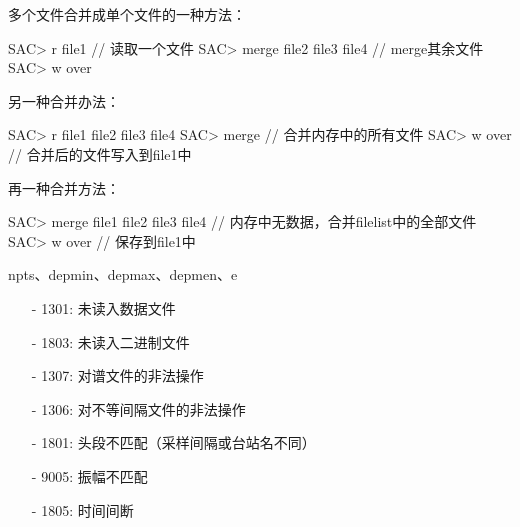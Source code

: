多个文件合并成单个文件的一种方法：
\begin{SACCode} 
SAC> r file1                        // 读取一个文件
SAC> merge file2 file3 file4        // merge其余文件
SAC> w over
\end{SACCode}

另一种合并办法：
\begin{SACCode}
SAC> r file1 file2 file3 file4  
SAC> merge                      // 合并内存中的所有文件
SAC> w over                     // 合并后的文件写入到file1中
\end{SACCode}

再一种合并方法：
\begin{SACCode}
SAC> merge file1 file2 file3 file4  // 内存中无数据，合并filelist中的全部文件
SAC> w over                         // 保存到file1中
\end{SACCode}

npts、depmin、depmax、depmen、e

\begin{itemize}
\item[-]1301: 未读入数据文件
\item[-]1803: 未读入二进制文件
\item[-]1307: 对谱文件的非法操作
\item[-]1306: 对不等间隔文件的非法操作
\item[-]1801: 头段不匹配（采样间隔或台站名不同）
\item[-]9005: 振幅不匹配
\end{itemize}

\begin{itemize}
\item[-]1805: 时间间断
\end{itemize}


